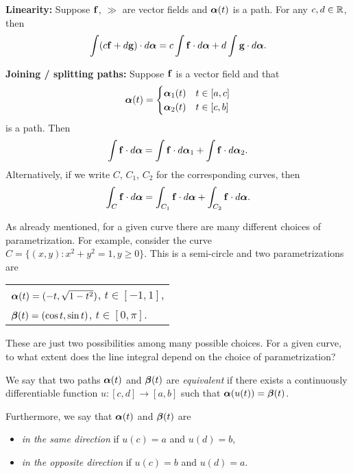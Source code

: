 \noindent
\textbf{Linearity:}
Suppose \(\mathbf{f}\), \(\gg\) are vector fields and \(\boldsymbol{\alpha}(t)\) is a path. For any \(c,d\in \mathbb{R}\), then
\[
    \int (c\mathbf{f} + d\mathbf{g}) \cdot d\boldsymbol{\alpha} =  c \int \mathbf{f}  \cdot d\boldsymbol{\alpha} +  d \int \mathbf{g} \cdot d\boldsymbol{\alpha}.
\]

\noindent
\textbf{Joining / splitting paths:}
Suppose \(\mathbf{f}\) is a vector field and that
\[
    \boldsymbol{\alpha}(t) = \begin{cases}
        \boldsymbol{\alpha}_1(t) & t\in [a,c] \\
        \boldsymbol{\alpha}_2(t) & t\in [c,b]
    \end{cases}
\]
is a path.
Then
\[
    \int \mathbf{f}  \cdot d\boldsymbol{\alpha} = \int \mathbf{f}  \cdot d\boldsymbol{\alpha}_1  + \int \mathbf{f}  \cdot d\boldsymbol{\alpha}_2.
\]
Alternatively, if we write \(C\), \(C_1\), \(C_2\) for the corresponding curves, then
\[
    \int_{C} \mathbf{f}  \cdot d\boldsymbol{\alpha} = \int_{C_1} \mathbf{f}  \cdot d\boldsymbol{\alpha} + \int_{C_2} \mathbf{f}  \cdot d\boldsymbol{\alpha}.
\]

As already mentioned, for a given curve there are many different choices of parametrization.
For example, consider the curve \(C = \{(x,y) : x^2 + y^2 = 1, y\geq 0\}\).
This is a semi-circle and two parametrizations are
\begin{center}
    \begin{tabular}{l}
        \(\boldsymbol{\alpha}(t) = (-t, \sqrt{1-t^2})\), \(t\in [-1,1]\), \\
        \(\boldsymbol{\beta}(t) = (\cos t, \sin t)\), \(t\in [0,\pi]\).
    \end{tabular}
\end{center}
These are just two possibilities among many possible choices.
For a given curve, to what extent does the line integral depend on the choice of parametrization?

\begin{definition}
    We say that two paths \(\boldsymbol{\alpha}(t)\) and \(\boldsymbol{\beta}(t)\) are \emph{equivalent} if there exists a continuously differentiable function \(u : [c,d] \to [a,b] \) such that \(\boldsymbol{\alpha}(u(t)) = \boldsymbol{\beta}(t)\).

    Furthermore, we say that \(\boldsymbol{\alpha}(t)\) and \(\boldsymbol{\beta}(t)\) are
    \begin{itemize}
        \item \emph{in the same direction} if \(u(c)=a\) and \(u(d)=b\),
        \item \emph{in the opposite direction} if \(u(c)=b\) and \(u(d)=a\).
    \end{itemize}
\end{definition}

